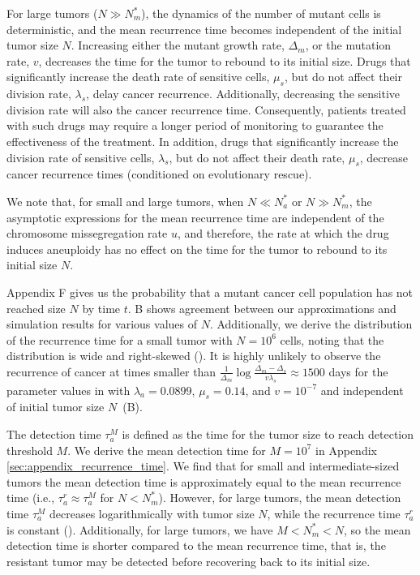 \documentclass[12pt]{extarticle}
\begin{document}
For large tumors ($N \gg N_m^*$), the dynamics of the number of mutant cells is deterministic, and the mean recurrence time becomes independent of the initial tumor size $N$.
Increasing either the mutant growth rate, $\Delta_m$, or the mutation rate, $v$, decreases the time for the tumor to rebound to its initial size.
Drugs that significantly increase the death rate of sensitive cells, $\mu_s$, but do not affect their division rate, $\lambda_s$, delay cancer recurrence. Additionally, decreasing the sensitive division rate will also the cancer recurrence time. Consequently, patients treated with such drugs may require a longer period of monitoring to guarantee the effectiveness of the treatment. %
In addition, drugs that significantly increase the division rate of sensitive cells, $\lambda_s$, but do not affect their death rate, $\mu_s$, decrease cancer recurrence times (conditioned on evolutionary rescue). 

We note that, for small and large tumors, when $N \ll N_a^*$ or $N \gg N_m^*$, the asymptotic expressions for the mean recurrence time are independent of the chromosome missegregation rate $u$, and therefore, the rate at which the drug induces aneuploidy has no effect on the time for the tumor to rebound to its initial size $N$.

Appendix F gives us the probability that a mutant cancer cell population has not reached size $N$ by time $t$. B shows agreement between our approximations and simulation results for various values of $N$. Additionally, we derive the distribution of the recurrence time for a small tumor with $N=10^6$ cells, noting that the distribution is wide and right-skewed (). It is highly unlikely to observe the recurrence of cancer at times smaller than $\frac{1}{\Delta_m}\log\frac{\Delta_m-\Delta_s}{v\lambda_s}\approx 1500$ days for the parameter values in  with $\lambda_a=0.0899$, $\mu_s=0.14$, and $v=10^{-7}$ and independent of initial tumor size $N$~(B). 

The detection time $\tau_a^{M}$ is defined as the time for the tumor size to reach detection threshold $M$. We derive the mean detection time for $M=10^7$ in Appendix \ref{sec:appendix_recurrence_time}. We find that for small and intermediate-sized tumors the mean detection time is approximately equal to the mean recurrence time (i.e., $\tau_a^r\approx\tau_a^{M}$ for $N<N_m^*$). %
However, for large tumors, the mean detection time $\tau_a^{M}$ decreases logarithmically with tumor size $N$, while the recurrence time $\tau_a^{r}$ is constant (). Additionally, for large tumors, we have $M<N_m^*<N$, so the mean detection time is shorter compared to the mean recurrence time, that is, the resistant tumor may be detected before recovering back to its initial size.
\end{document}
